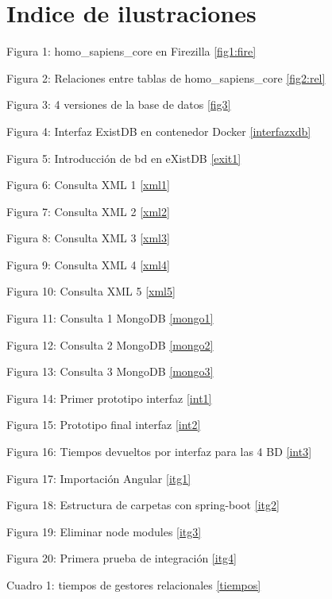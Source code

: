 \documentclass[12pt,a4paper]{article}
\begin{document}
\newpage
\section*{Indice de ilustraciones}



Figura 1:  homo\_sapiens\_core en Firezilla \ref{fig1:fire}

Figura 2: Relaciones entre tablas de homo\_sapiens\_core \ref{fig2:rel}

Figura 3: 4 versiones de la base de datos  \ref{fig3}

Figura 4: Interfaz ExistDB en contenedor Docker \ref{interfazxdb}

Figura 5: Introducción de bd en eXistDB \ref{exit1}

Figura 6: Consulta XML 1 \ref{xml1}

Figura 7: Consulta XML 2 \ref{xml2}

Figura 8: Consulta XML 3 \ref{xml3}

Figura 9: Consulta XML 4 \ref{xml4}

Figura 10: Consulta XML 5 \ref{xml5}

Figura 11: Consulta 1 MongoDB \ref{mongo1}

Figura 12: Consulta 2 MongoDB \ref{mongo2}

Figura 13: Consulta 3 MongoDB \ref{mongo3}

Figura 14: Primer prototipo interfaz \ref{int1}

Figura 15: Prototipo final interfaz \ref{int2}

Figura 16: Tiempos devueltos por interfaz para las 4 BD \ref{int3}

Figura 17: Importación Angular \ref{itg1}

Figura 18: Estructura de carpetas con spring-boot \ref{itg2}

Figura 19: Eliminar node modules \ref{itg3}

Figura 20: Primera prueba de integración \ref{itg4}

Cuadro 1: tiempos de gestores relacionales \ref{tiempos}
	





\end{document}
